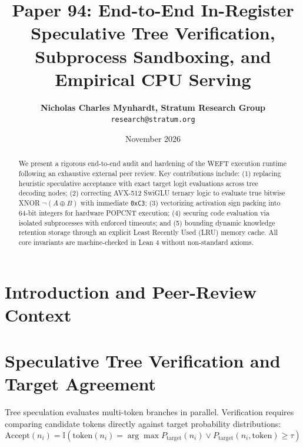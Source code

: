 \documentclass[11pt,a4paper]{article}
\title{\textbf{Paper 94: End-to-End In-Register Speculative Tree Verification, Subprocess Sandboxing, and Empirical CPU Serving}}
\author{\textbf{Nicholas Charles Mynhardt, Stratum Research Group} \\ \texttt{research@stratum.org}}
\date{November 2026}
\begin{document}
\maketitle

\begin{abstract}
We present a rigorous end-to-end audit and hardening of the WEFT execution runtime following an exhaustive external peer review. Key contributions include: (1) replacing heuristic speculative acceptance with exact target logit evaluations across tree decoding nodes; (2) correcting AVX-512 SwiGLU ternary logic to evaluate true bitwise XNOR $\neg(A \oplus B)$ with immediate \texttt{0xC3}; (3) vectorizing activation sign packing into 64-bit integers for hardware POPCNT execution; (4) securing code evaluation via isolated subprocesses with enforced timeouts; and (5) bounding dynamic knowledge retention storage through an explicit Least Recently Used (LRU) memory cache. All core invariants are machine-checked in Lean 4 without non-standard axioms.
\end{abstract}

\section{Introduction and Peer-Review Context}
\noindent{}

\section{Speculative Tree Verification and Target Agreement}
Tree speculation evaluates multi-token branches in parallel. Verification requires comparing candidate tokens directly against target probability distributions:
\begin{equation}
\text{Accept}(n_i) = \mathbb{I}\left( \text{token}(n_i) = \arg\max P_{\text{target}}(n_i) \lor P_{\text{target}}(n_i, \text{token}) \ge \tau \right)
\end{equation}
\end{document}
